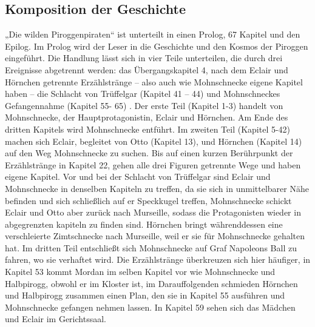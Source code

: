 {\subsection{Komposition der Geschichte}
„Die wilden Piroggenpiraten“ ist unterteilt in einen Prolog, 67 Kapitel und den Epilog. Im Prolog wird der Leser in die Geschichte und den Kosmos der Piroggen eingeführt. Die Handlung lässt sich in vier Teile unterteilen, die durch drei Ereignisse abgetrennt werden: das Übergangskapitel 4, nach dem Eclair und Hörnchen getrennte Erzählstränge – also auch wie Mohnschnecke eigene Kapitel haben – die Schlacht von Trüffelgar (Kapitel 41 – 44) und Mohnschneckes Gefangennahme (Kapitel 55- 65) . Der erste Teil (Kapitel 1-3) handelt von Mohnschnecke, der Hauptprotagonistin, Eclair und Hörnchen. Am Ende des dritten Kapitels wird Mohnschnecke entführt. Im zweiten Teil (Kapitel 5-42) machen sich Eclair, begleitet von Otto (Kapitel 13), und Hörnchen (Kapitel 14) auf den Weg Mohnschnecke zu suchen. Bis auf einen kurzen Berührpunkt der Erzählstränge in Kapitel 22, gehen alle drei Figuren getrennte Wege und haben eigene Kapitel. Vor und bei der Schlacht von Trüffelgar sind Eclair und Mohnschnecke in denselben Kapiteln zu treffen, da sie sich in unmittelbarer Nähe befinden und sich schließlich auf er Speckkugel treffen,  Mohnschnecke schickt Eclair und Otto aber zurück nach Murseille, sodass die Protagonisten wieder in abgegrenzten kapiteln zu finden sind. Hörnchen bringt währenddessen eine verschleierte Zimtschnecke nach Murseille, weil er sie für Mohnschnecke gehalten hat. Im dritten Teil entschließt sich Mohnschnecke auf Graf Napoleons Ball zu fahren, wo sie verhaftet wird. Die Erzählstränge überkreuzen sich hier häufiger, in Kapitel 53 kommt Mordan im selben Kapitel vor wie Mohnschnecke und Halbpirogg, obwohl er im Kloster ist, im Darauffolgenden schmieden Hörnchen und Halbpirogg zusammen einen Plan, den sie in Kapitel 55 ausführen und Mohnschnecke gefangen nehmen lassen. In Kapitel 59 sehen sich das Mädchen und Eclair im Gerichtssaal. 

}
